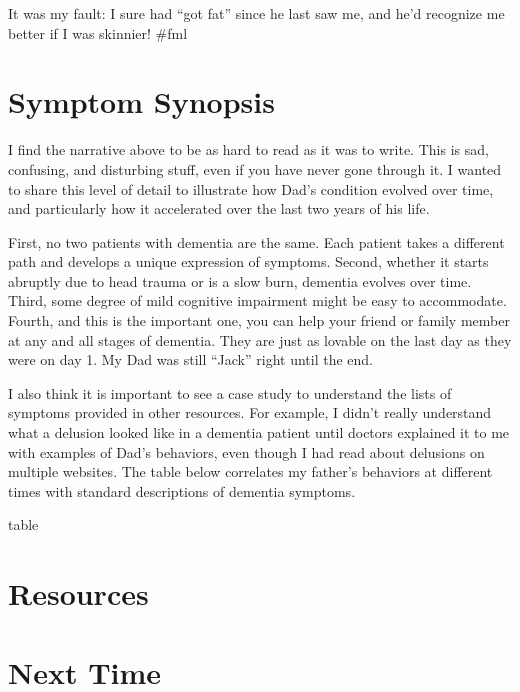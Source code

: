\documentclass{article}
\begin{document}
It was my fault: I sure had ``got fat'' since he last saw me, and he'd recognize me better if I was skinnier! \#fml

\section*{Symptom Synopsis}

I find the narrative above to be as hard to read as it was to write. This is sad, confusing, and disturbing stuff, even if you have never gone through it. I wanted to share this level of detail to illustrate how Dad's condition evolved over time, and particularly how it accelerated over the last two years of his life. 

First, no two patients with dementia are the same. Each patient takes a different path and develops a unique expression of symptoms. Second, whether it starts abruptly due to head trauma or is a slow burn, dementia evolves over time. Third, some degree of mild cognitive impairment might be easy to accommodate. Fourth, and this is the important one, you can help your friend or family member at any and all stages of dementia. They are just as lovable on the last day as they were on day 1. My Dad was still ``Jack'' right until the end.

I also think it is important to see a case study to understand the lists of symptoms provided in other resources. For example, I didn't really understand what a delusion looked like in a dementia patient until doctors explained it to me with examples of Dad's behaviors, even though I had read about delusions on multiple websites. The table below correlates my father's behaviors at different times with standard descriptions of dementia symptoms. 

table

\section*{Resources}

\section*{Next Time}




\end{document}
